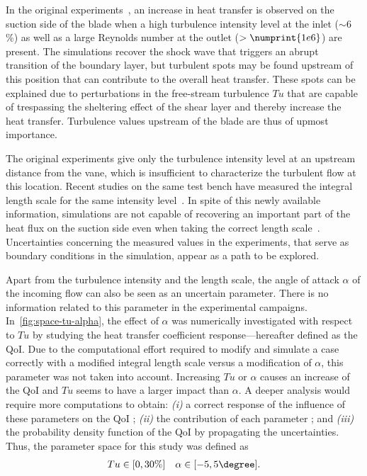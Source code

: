 
In the original experiments~\cite{arts1990}, an increase in heat transfer is observed on the suction side of the blade when a high turbulence intensity level at the inlet ($\sim 6$\%) as well as a large Reynolds number at the outlet ($>\numprint{1e6}$) are present. The simulations recover the shock wave that triggers an abrupt transition of the boundary layer, but turbulent spots may be found upstream of this position that can contribute to the overall heat transfer. These spots can be explained due to perturbations in the free-stream turbulence $Tu$ that are capable of trespassing the sheltering effect of the shear layer and thereby increase the heat transfer. Turbulence values upstream of the blade are thus of upmost importance.

The original experiments give only the turbulence intensity level at an upstream distance from the vane, which is insufficient to characterize the turbulent flow at this location. Recent studies on the same test bench have measured the integral length scale for the same intensity level~\cite{Fontaneto2014}. In spite of this newly available information, simulations are not capable of recovering an important part of the heat flux on the suction side even when taking the correct length scale~\cite{Pichler2016}. Uncertainties concerning the measured values in the experiments, that serve as boundary conditions in the simulation, appear as a path to be explored. 

Apart from the turbulence intensity and the length scale, the angle of attack $\alpha$ of the incoming flow can also be seen as an uncertain parameter. There is no information related to this parameter in the experimental campaigns. In~\cref{fig:space-tu-alpha}, the effect of $\alpha$ was numerically investigated with respect to $Tu$ by studying the heat transfer coefficient response---hereafter defined as the QoI. Due to the computational effort required to modify and simulate a case correctly with a modified integral length scale versus a modification of $\alpha$, this parameter was not taken into account. Increasing $Tu$ or $\alpha$ causes an increase of the QoI and $Tu$ seems to have a larger impact than $\alpha$. A deeper analysis would require more computations to obtain: \textit{(i)} a correct response of the influence of these parameters on the QoI ; \textit{(ii)} the contribution of each parameter ; and \textit{(iii)} the probability density function of the QoI by propagating the uncertainties. Thus, the parameter space for this study was defined as
\begin{align}
Tu \in [0, 30\%] \quad \alpha \in [-5,5\degree].
\end{align}

